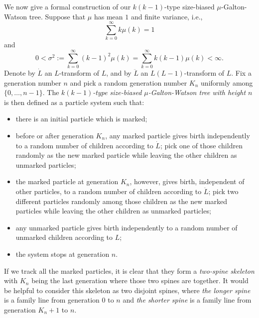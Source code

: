 \documentclass[UTF8]{pkuthss}
\theoremstyle{plain}
\theoremstyle{definition}
\numberwithin{equation}{section}
\begin{document}
We now give a formal construction of our $k(k-1)$-type size-biased $\mu$-Galton-Watson tree. 
Suppose that $\mu$ has mean $1$ and finite variance, i.e.,
\begin{equation}\label{eq:mean}
\sum_{k=0}^\infty k \mu(k)	=1
\end{equation}
and
\begin{equation}\label{eq:variance}
0	
<	\sigma^2
:=	\sum_{k=0}^\infty  (k-1)^2 \mu(k)
=	\sum_{k=0}^\infty k(k-1) \mu(k)
<	\infty.
\end{equation}
Denote by $\dot L$ an $L$-transform of $L$, and by $\ddot L$ an $L(L-1)$-transform of $L$.
Fix a generation number $n$ and pick a random generation number $K_n$ uniformly among $\{0,\dots,n-1\}$.
The \emph{$k(k-1)$-type size-biased $\mu$-Galton-Watson tree with height $n$} is then defined as a particle system such that:
\begin{itemize}
	\item
	there is an initial particle which is marked;
	\item
	before or after generation $K_n$, any marked particle gives birth independently to a random number of children according to $\dot L$;
	pick one of those children randomly as the new marked particle while leaving the other children as unmarked particles;
	\item
	the marked particle at generation $K_n$, however, gives birth, independent of other particles, to a random number of children according to $\ddot L$;
	pick two different particles randomly among those children as the new marked particles while leaving the other children as unmarked particles;
	\item
	any unmarked particle gives birth independently to a random number of unmarked children according to $L$;
	\item
	the system stops at generation $n$.
\end{itemize}

If we track all the marked particles, it is clear that they form a \emph{two-spine skeleton} with $K_n$ being the last generation where those two spines are together.
It would be helpful to consider this skeleton as two disjoint spines,
where \emph{the longer spine} is a family line from generation $0$ to $n$ and \emph{the shorter spine} is a family line from generation $K_n+1$ to $n$.
\end{document}
